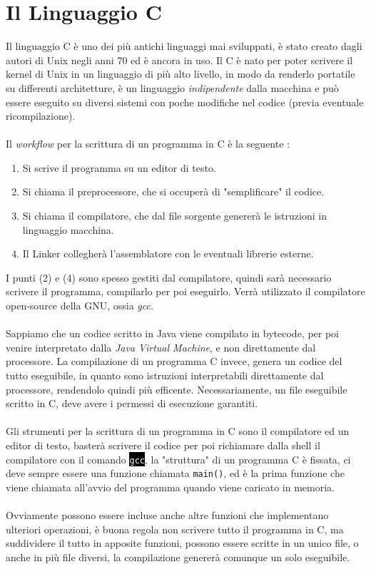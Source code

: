 \documentclass[12pt, letterpaper]{article}
\newcommand{\code}[1]{\colorbox{light-gray}{\texttt{#1}}}
\newcommand{\shelll}[1]{\colorbox{black}{\textcolor{white}{\texttt{#1}}}}
\newcommand{\acc}{\\\hphantom{}\\}
\begin{document}
\section{Il Linguaggio C}
Il linguaggio C è uno dei più antichi linguaggi mai sviluppati, è stato creato dagli autori di Unix negli anni 70 ed è ancora 
in uso. Il C è nato per poter scrivere il kernel di Unix in un linguaggio di più alto livello, in modo da renderlo portatile 
su differenti architetture, è un linguaggio \textit{indipendente} dalla macchina e può essere eseguito su diversi 
sistemi con poche modifiche nel codice (previa eventuale ricompilazione).\acc 
Il \textit{workflow} per la scrittura di un programma in C è la seguente : \begin{enumerate}
    \item Si scrive il programma su un editor di testo.
    \item Si chiama il preprocessore, che si occuperà di "semplificare" il codice.
    \item Si chiama il compilatore, che dal file sorgente genererà le istruzioni in linguaggio macchina. 
    \item Il Linker collegherà l'assemblatore con le eventuali librerie esterne.
\end{enumerate}
I punti (2) e (4) sono spesso gestiti dal compilatore, quindi sarà necessario scrivere il programma, compilarlo per poi 
eseguirlo. Verrà utilizzato il compilatore open-source della GNU, ossia \textit{gcc}.\acc 
Sappiamo che un codice scritto in Java viene compilato in bytecode, per poi venire interpretato dalla \textit{Java Virtual Machine},
 e non direttamente dal processore. La compilazione di un programma C invece, genera un codice del tutto eseguibile, in quanto 
sono istruzioni interpretabili direttamente dal processore, rendendolo quindi più efficente. Necessariamente, un file eseguibile 
scritto in C, deve avere i permessi di esecuzione garantiti.\acc 
Gli strumenti per la scrittura di un programma in C sono il compilatore ed un editor di testo, basterà scrivere il codice per 
poi richiamare dalla shell il compilatore con il comando \shelll{gcc}, la "struttura" di un programma C è fissata, ci deve 
sempre essere una funzione chiamata \code{main()}, ed è la prima funzione che viene chiamata all'avvio del programma quando viene 
caricato in memoria.\acc 
Ovviamente possono essere incluse anche altre funzioni che implementano ulteriori operazioni, è buona regola non scrivere tutto il 
programma in C, ma suddividere il tutto in apposite funzioni, possono essere scritte in un unico file, o anche in più file diversi, 
la compilazione genererà comunque un solo eseguibile.
\end{document}
